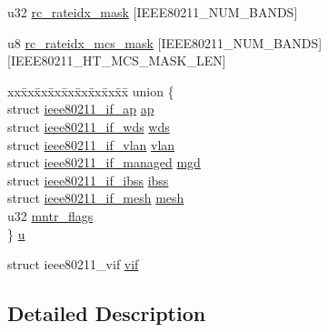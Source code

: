 \begin{DoxyCompactItemize}
\item 
u32 \hyperlink{structieee80211__sub__if__data_a4291130d4a0d651a69780340ad638ce2}{rc\-\_\-rateidx\-\_\-mask} \mbox{[}I\-E\-E\-E80211\-\_\-\-N\-U\-M\-\_\-\-B\-A\-N\-D\-S\mbox{]}
\item 
u8 \hyperlink{structieee80211__sub__if__data_af3f2e32024ff5987cf20338a95ecc35f}{rc\-\_\-rateidx\-\_\-mcs\-\_\-mask} \mbox{[}I\-E\-E\-E80211\-\_\-\-N\-U\-M\-\_\-\-B\-A\-N\-D\-S\mbox{]}\mbox{[}I\-E\-E\-E80211\-\_\-\-H\-T\-\_\-\-M\-C\-S\-\_\-\-M\-A\-S\-K\-\_\-\-L\-E\-N\mbox{]}
\item 
\begin{tabbing}
xx\=xx\=xx\=xx\=xx\=xx\=xx\=xx\=xx\=\kill
union \{\\
\>struct \hyperlink{structieee80211__if__ap}{ieee80211\_if\_ap} \hyperlink{structieee80211__sub__if__data_aa7802c0ad2f6a05610aea467f294ebd2}{ap}\\
\>struct \hyperlink{structieee80211__if__wds}{ieee80211\_if\_wds} \hyperlink{structieee80211__sub__if__data_a09671aeb534ab76414be89358eb296cd}{wds}\\
\>struct \hyperlink{structieee80211__if__vlan}{ieee80211\_if\_vlan} \hyperlink{structieee80211__sub__if__data_a0306ac04b10e73aa887c6d5a96332fa2}{vlan}\\
\>struct \hyperlink{structieee80211__if__managed}{ieee80211\_if\_managed} \hyperlink{structieee80211__sub__if__data_ac43070ed59c628dcab245dc2dbaa0fd7}{mgd}\\
\>struct \hyperlink{structieee80211__if__ibss}{ieee80211\_if\_ibss} \hyperlink{structieee80211__sub__if__data_ac62d9e6d8045efd0110b40c2ce341b56}{ibss}\\
\>struct \hyperlink{structieee80211__if__mesh}{ieee80211\_if\_mesh} \hyperlink{structieee80211__sub__if__data_aa9083f90f4d38afa13c9d233a07a6d9d}{mesh}\\
\>u32 \hyperlink{structieee80211__sub__if__data_a65a8ca3269e0e7023f6f265ee9ad1535}{mntr\_flags}\\
\} \hyperlink{structieee80211__sub__if__data_a369ec3436f600c083e559d7909a206ea}{u}\\

\end{tabbing}\item 
struct ieee80211\-\_\-vif \hyperlink{structieee80211__sub__if__data_a32ff3992b201e6f0a8af4c4a0e09fd4c}{vif}
\end{DoxyCompactItemize}


\subsection{Detailed Description}


